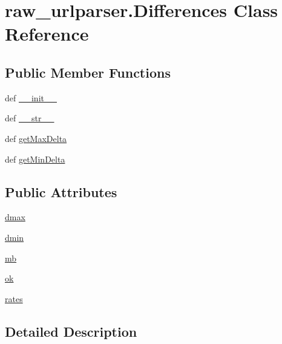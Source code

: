 \hypertarget{classraw__urlparser_1_1_differences}{\section{raw\-\_\-urlparser.\-Differences Class Reference}
\label{classraw__urlparser_1_1_differences}
}
\subsection*{Public Member Functions}
\begin{DoxyCompactItemize}
\item 
def \hyperlink{classraw__urlparser_1_1_differences_a9aa766af44c2b787343ffcbf466e1a83}{\-\_\-\-\_\-init\-\_\-\-\_\-}
\item 
def \hyperlink{classraw__urlparser_1_1_differences_a1db8d30e42716215ae4348c8182c3b7a}{\-\_\-\-\_\-str\-\_\-\-\_\-}
\item 
def \hyperlink{classraw__urlparser_1_1_differences_a6cad9a98b3d3c48b41d752b6bce8776e}{get\-Max\-Delta}
\item 
def \hyperlink{classraw__urlparser_1_1_differences_ab80ae6b8351413164c04cda59d316a31}{get\-Min\-Delta}
\end{DoxyCompactItemize}
\subsection*{Public Attributes}
\begin{DoxyCompactItemize}
\item 
\hyperlink{classraw__urlparser_1_1_differences_ad2b06158b655136bc7743dc6ac8d1e2a}{dmax}
\item 
\hyperlink{classraw__urlparser_1_1_differences_af8457a8e542de086595e7fbbffdf713c}{dmin}
\item 
\hyperlink{classraw__urlparser_1_1_differences_ab4c3073b8c569b7791ab3b8e21e9b364}{mb}
\item 
\hyperlink{classraw__urlparser_1_1_differences_a46fe97bedb977585a0b27d7408ace118}{ok}
\item 
\hyperlink{classraw__urlparser_1_1_differences_ad4e7eadb659a1cdcba90793cc52af174}{rates}
\end{DoxyCompactItemize}


\subsection{Detailed Description}



